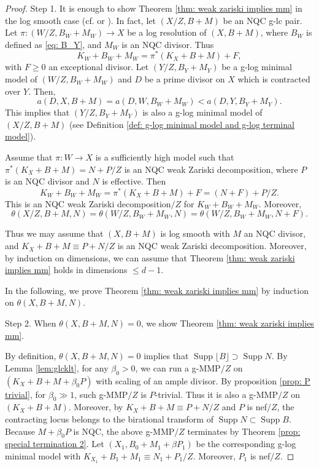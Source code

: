 \documentclass[11pt]{amsart}
\newcommand{\Supp}{\operatorname{Supp}}
\newcommand{\lf}{\lfloor}
\newcommand{\rf}{\rfloor}
\begin{document}
\begin{proof}

Step 1. It is enough to show Theorem \ref{thm: weak zariski implies mm} in the log smooth case (cf. \cite[Remark 2.6]{Birkar10} or \cite[Remark 2.8]{Birkar12}). In fact, let $(X/Z,B+M)$ be an NQC g-lc pair. Let $\pi:(W/Z,B_W+M_W)\to X$ be a log resolution of $(X,B+M)$, where $B_W$ is defined as \eqref{eq: B_Y}, and $M_W$ is an NQC divisor. Thus
\[
K_W+B_W+M_W=\pi^{*}(K_X+B+M)+F,
\] with $F\ge0$ an exceptional divisor. Let $(Y/Z,B_Y+M_Y)$ be a g-log minimal model of $(W/Z,B_W+M_W)$ and $D$ be a prime divisor on $X$ which is contracted over $Y$. Then,
	\[
	a(D,X,B+M)=a(D,W,B_W+M_W)<a(D,Y,B_Y+M_Y).
	\]
	This implies that $(Y/Z,B_Y+M_Y)$ is also a g-log minimal model of $(X/Z,B+M)$ (see Definition \ref{def: g-log minimal model and g-log terminal model}). 
	
	Assume that $\pi: W \to X$ is a sufficiently high model such that  $\pi^{*}(K_X+B+M)=N+P/Z$ is an NQC weak Zariski decomposition, where $P$ is an NQC divisor and $N$ is effective. Then 
	\[
	K_W+B_W+M_W=\pi^{*}(K_X+B+M)+F=(N+F)+P/Z.
	\]
	This is an NQC weak Zariski decomposition$/Z$ for $K_W+B_W+M_W$. Moreover, 
	\[
	\theta(X/Z,B+M,N)=\theta(W/Z,B_W+M_W,N)=\theta(W/Z,B_W+M_W,N+F).
	\]

Thus we may assume that $(X,B+M)$ is log smooth with $M$ an NQC divisor, and $K_X+B+M \equiv P+N/Z$ is an NQC weak Zariski decomposition. Moreover, by induction on dimensions, we can assume that Theorem \ref{thm: weak zariski implies mm} holds in dimensions $\leq d-1$. 

In the following, we prove Theorem \ref{thm: weak zariski implies mm} by induction on $\theta(X,B+M,N)$.

Step 2. When $\theta(X,B+M,N)=0$, we show Theorem \ref{thm: weak zariski implies mm}.

	By definition, $\theta(X,B+M,N)=0$ implies that $\Supp\lf B \rf \supset \Supp N$. By Lemma \ref{lem:glcklt}, for any $\beta_0 > 0$, we can run a g-MMP$/Z$ on $(K_X+B+M+\beta_0 P)$ with scaling of an ample divisor. By proposition \ref{prop: P trivial}, for $\beta_0\gg 1$, such g-MMP$/Z$ is $P$-trivial. Thus it is also a g-MMP$/Z$ on $(K_X+B+M)$. Moreover, by $K_X+B+M \equiv P+N/Z$ and $P$ is nef$/Z$, the contracting locus belongs to the birational transform of $\Supp N \subset \Supp B$. Because $M+\beta_0 P$ is NQC, the above g-MMP$/Z$ terminates by Theorem \ref{prop: special termination 2}. Let $(X_1, B_0+M_1+\beta P_1)$ be the corresponding g-log minimal model with $K_{X_1}+B_1+M_1 \equiv N_1+P_1/Z$. Moreover, $P_1$ is nef$/Z$.
	

\end{proof}
\end{document}
